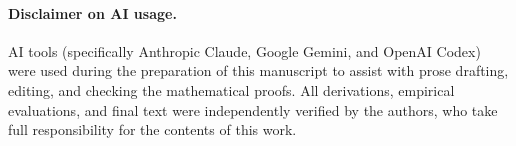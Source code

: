\paragraph{Disclaimer on AI usage.}
AI tools (specifically Anthropic Claude, Google Gemini, and OpenAI Codex) were used during the preparation of this manuscript to assist with prose drafting, editing, and checking the mathematical proofs. All derivations, empirical evaluations, and final text were independently verified by the authors, who take full responsibility for the contents of this work.
